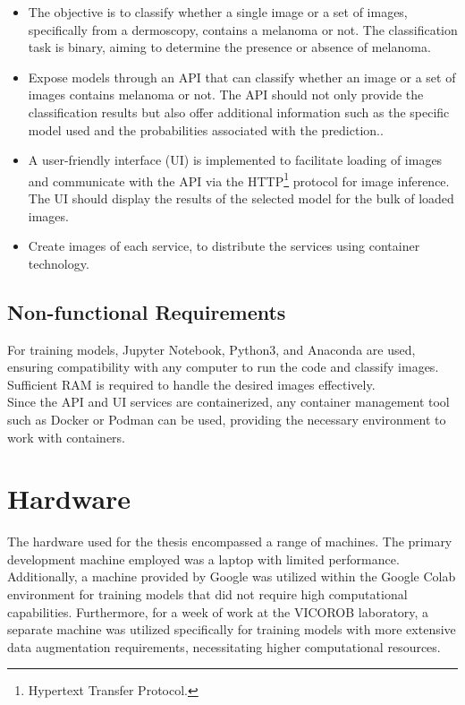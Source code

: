 \begin{itemize} \item The objective is to classify whether a single image or a
      set of images, specifically from a dermoscopy, contains a melanoma or
      not. The classification task is binary, aiming to determine the presence
      or absence of melanoma.

    \item Expose models through an API that can classify whether an image or a
      set of images contains melanoma or not. The API should not only provide
      the classification results but also offer additional information such as
      the specific model used and the probabilities associated with the
      prediction..

    \item A user-friendly interface (UI) is implemented to facilitate loading
      of images and communicate with the API via the HTTP\footnote{Hypertext
      Transfer Protocol.} protocol for image inference. The UI should display
      the results of the selected model for the bulk of loaded images.

    \item Create images of each service, to distribute the services using container
      technology.
\end{itemize}

\subsection{Non-functional Requirements}

For training models, Jupyter Notebook, Python3, and Anaconda are used, ensuring
compatibility with any computer to run the code and classify images. Sufficient
RAM is required to handle the desired images effectively. \\

Since the API and UI services are containerized, any container management tool
such as Docker or Podman can be used, providing the necessary environment to
work with containers.

\newpage

\section{Hardware}

The hardware used for the thesis encompassed a range of machines. The primary
development machine employed was a laptop with limited performance.
Additionally, a machine provided by Google was utilized within the Google Colab
environment for training models that did not require high computational
capabilities. Furthermore, for a week of work at the VICOROB laboratory, a
separate machine was utilized specifically for training models with more
extensive data augmentation requirements, necessitating higher computational
resources. \\

